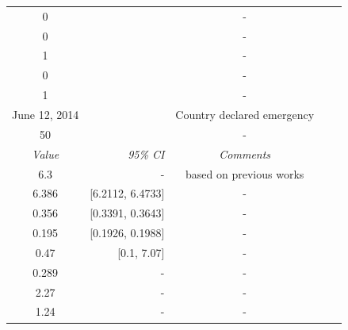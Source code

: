 \documentclass[10pt, journal,onecolumn]{IEEEtran}
\begin{document}
\begin{appendix}
\begin{table}[h]
{\begin{tabular}{@{}crccc@{}}
0& & -\\
0& & -\\
1& & -\\
0& & -\\
1& &-\\
June 12, 2014 &  & Country declared emergency\\
50 & & -\\
\cmidrule{1-3}
\textit{Value} & \textit{95\% CI} & \textit{Comments} \\
\midrule
6.3 & - & based on previous works \cite{}\\
6.386 & [6.2112, 6.4733] & -\\
0.356 & [0.3391, 0.3643] & -\\
0.195 & [0.1926, 0.1988] & -\\
0.47 & [0.1, 7.07] & -\\
0.289 & - & -\\
2.27 & - &-\\
1.24 & - &-\\
\end{tabular}
}
\label{Table:parameter}
\end{table}



\end{appendix}
\end{document}
